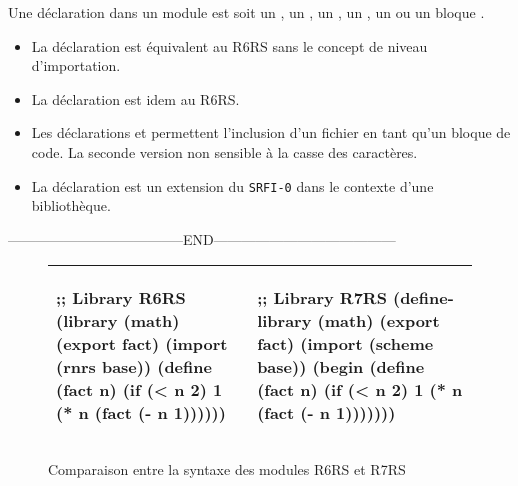 Une déclaration dans un module est soit un , un ,
un , un , un  ou un
bloque .
\begin{itemize}
  \item La déclaration  est équivalent au R6RS sans le concept
    de niveau d'importation.

  \item La déclaration  est idem au R6RS.

  \item Les déclarations  et  permettent
    l'inclusion d'un fichier en tant qu'un bloque de code.  La seconde version
    non sensible à la casse des caractères.

  \item La déclaration  est un extension du \texttt{SRFI-0}
    dans le contexte d'une bibliothèque.

\end{itemize}

--------------------------------------END---------------------------------------\\



\begin{center}
  \begin{figure}[h]
  \begin{tabular}{|l|l|}
    \hline
    \begin{mplisting}{0.5}
;; Library R6RS
(library (math)
  (export fact)
  (import (rnrs base))
  (define (fact n)
    (if (< n 2)
      1
      (* n (fact (- n 1))))))
\end{mplisting} &
    \begin{mplisting}{0.5}
;; Library R7RS
(define-library (math)
  (export fact)
  (import (scheme base))
  (begin
    (define (fact n)
      (if (< n 2)
        1
        (* n (fact (- n 1)))))))
\end{mplisting}\\\hline
  \end{tabular}
    \caption{Comparaison entre la syntaxe des modules R6RS et R7RS}
  \label{fig:r6rs_r7rs_math_mdoule}
\end{figure}
\end{center}

